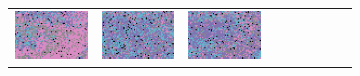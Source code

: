 \documentclass{ipol}
\begin{document}
\begin{figure}[ht]
\begin{subfigure}[t]{\linewidth}
\begin{tabular}{ccccccccc}
                \includegraphics[width=\s]{images/night/DHT/iso_j98_64_grids.png}&
                \includegraphics[width=\s]{images/night/LINEAR/iso_j98_64_grids.png}&
                \includegraphics[width=\s]{images/night/PPG/iso_j98_64_grids.png}&

\end{tabular}
\end{subfigure}
\end{figure}
\end{document}
